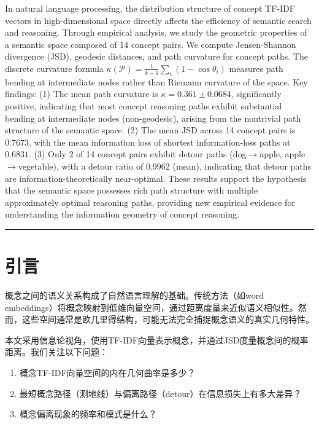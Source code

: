 \documentclass[
 UTF8,
 fontset=mac,
]{ctexart}
\begin{document}
In natural language processing, the distribution structure of concept TF-IDF vectors in high-dimensional space directly affects the efficiency of semantic search and reasoning. Through empirical analysis, we study the geometric properties of a semantic space composed of 14 concept pairs. We compute Jensen-Shannon divergence (JSD), geodesic distances, and path curvature for concept paths. The discrete curvature formula $\kappa(\mathcal{P}) = \frac{1}{k-1}\sum_i(1-\cos\theta_i)$ measures path bending at intermediate nodes rather than Riemann curvature of the space. Key findings: (1) The mean path curvature is $\kappa = 0.361 \pm 0.0684$, significantly positive, indicating that most concept reasoning paths exhibit substantial bending at intermediate nodes (non-geodesic), arising from the nontrivial path structure of the semantic space. (2) The mean JSD across 14 concept pairs is $0.7673$, with the mean information loss of shortest information-loss paths at $0.6831$. (3) Only 2 of 14 concept pairs exhibit detour paths (dog$\to$apple, apple$\to$vegetable), with a detour ratio of $0.9962$ (mean), indicating that detour paths are information-theoretically near-optimal. These results support the hypothesis that the semantic space possesses rich path structure with multiple approximately optimal reasoning paths, providing new empirical evidence for understanding the information geometry of concept reasoning.

\begin{center}\rule{0.5\linewidth}{0.5pt}\end{center}

\section{引言}\label{introduction}

概念之间的语义关系构成了自然语言理解的基础。传统方法（如word embeddings）将概念映射到低维向量空间，通过距离度量来近似语义相似性。然而，这些空间通常是欧几里得结构，可能无法完全捕捉概念语义的真实几何特性。

本文采用信息论视角，使用TF-IDF向量表示概念，并通过JSD度量概念间的概率距离。我们关注以下问题：
\begin{enumerate}
    \item 概念TF-IDF向量空间的内在几何曲率是多少？
    \item 最短概念路径（测地线）与偏离路径（detour）在信息损失上有多大差异？
    \item 概念偏离现象的频率和模式是什么？
\end{enumerate}
\end{document}
